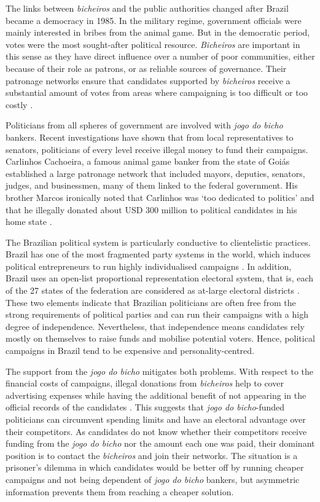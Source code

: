 \documentclass[a4paper,12pt]{article}
\begin{document}
The links between \emph{bicheiros} and the public authorities changed after Brazil became a democracy in 1985. In the military regime, government officials were mainly interested in bribes from the animal game. But in the democratic period, votes were the most sought-after political resource. \emph{Bicheiros} are important in this sense as they have direct influence over a number of poor communities, either because of their role as patrons, or as reliable sources of governance. Their patronage networks ensure that candidates supported by \emph{bicheiros} receive a substantial amount of votes from areas where campaigning is too difficult or too costly \citep[17]{misse2011crime}.

Politicians from all spheres of government are involved with \textit{jogo do bicho} bankers. Recent investigations have shown that from local representatives to senators, politicians of every level receive illegal money to fund their campaigns. Carlinhos Cachoeira, a famous animal game banker from the state of Goiás established a large patronage network that included mayors, deputies, senators, judges, and businessmen, many of them linked to the federal government. His brother Marcos ironically noted that Carlinhos was `too dedicated to politics' and that he illegally donated about USD 300 million to political candidates in his home state \citep{estadao2012gene}. 

The Brazilian political system is particularly conductive to clientelistic practices. Brazil has one of the most fragmented party systems in the world, which induces political entrepreneurs to run highly individualised campaigns \citep{figueiredo2000presidential,geddes1992institutional}. In addition, Brazil uses an open-list proportional representation electoral system, that is, each of the 27 states of the federation are considered as at-large electoral districts \citetext{\citealp{ames1995electoral}; \citealp[483]{samuels2000ambition}}. These two elements indicate that Brazilian politicians are often free from the strong requirements of political parties and can run their campaigns with a high degree of independence. Nevertheless, that independence means candidates rely mostly on themselves to raise funds and mobilise potential voters. Hence, political campaigns in Brazil tend to be expensive and personality-centred.

The support from the \emph{jogo do bicho} mitigates both problems. With respect to the financial costs of campaigns, illegal donations from \emph{bicheiros} help to cover advertising expenses while having the additional benefit of not appearing in the official records of the candidates \citep{congressoemfoco2007bicho,globo2012bicheiro}. This suggests that \emph{jogo do bicho}-funded politicians can circumvent spending limits and have an electoral advantage over their competitors. As candidates do not know whether their competitors receive funding from the \emph{jogo do bicho} nor the amount each one was paid, their dominant position is to contact the \emph{bicheiros} and join their networks. The situation is a prisoner's dilemma in which candidates would be better off by running cheaper campaigns and not being dependent of \emph{jogo do bicho} bankers, but asymmetric information prevents them from reaching a cheaper solution.
\end{document}
